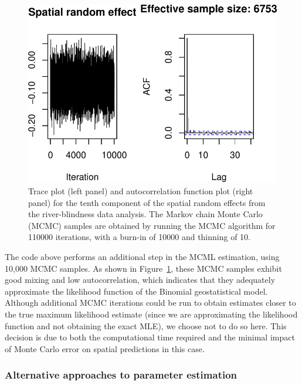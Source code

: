 \documentclass[
  letterpaper,
]{krantz}
\begin{document}
\begin{figure}[H]

{\centering \includegraphics{03_model-fitting_files/figure-pdf/fig-mcmc-10k-1.pdf}

}

\caption{\label{fig-mcmc-10k}Trace plot (left panel) and autocorrelation
function plot (right panel) for the tenth component of the spatial
random effects from the river-blindness data analysis. The Markov chain
Monte Carlo (MCMC) samples are obtained by running the MCMC algorithm
for 110000 iterations, with a burn-in of 10000 and thinning of 10.}

\end{figure}

The code above performs an additional step in the MCML estimation, using
10,000 MCMC samples. As shown in Figure~\ref{fig-mcmc-10k}, these MCMC
samples exhibit good mixing and low autocorrelation, which indicates
that they adequately approximate the likelihood function of the Binomial
geostatistical model. Although additional MCMC iterations could be run
to obtain estimates closer to the true maximum likelihood estimate
(since we are approximating the likelihood function and not obtaining
the exact MLE), we choose not to do so here. This decision is due to
both the computational time required and the minimal impact of Monte
Carlo error on spatial predictions in this case.

\hypertarget{alternative-approaches-to-parameter-estimation}{%
\subsubsection{Alternative approaches to parameter
estimation}\label{alternative-approaches-to-parameter-estimation}}
\end{document}
